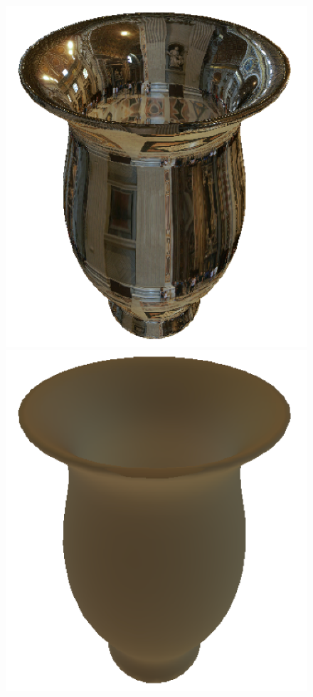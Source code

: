 \documentclass{article}
\theoremstyle{definition}
\theoremstyle{definition}
\begin{document}
\begin{figure}[h]
    \includegraphics[scale=0.25]{vase1}
    \includegraphics[scale=0.25]{vase1-sh}
    \centering
\end{figure}
\end{document}
